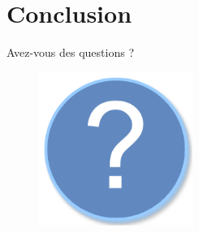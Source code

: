 \documentclass{beamer}
\begin{document}
\section*{Conclusion} %
\begin{frame}
	
\end{frame}

\begin{frame}{Avez-vous des questions ?}
	\begin{figure}[H]
		\centering
		\includegraphics[width=5cm]{interrogation.png}
	\end{figure}
\end{frame}
\end{document}
